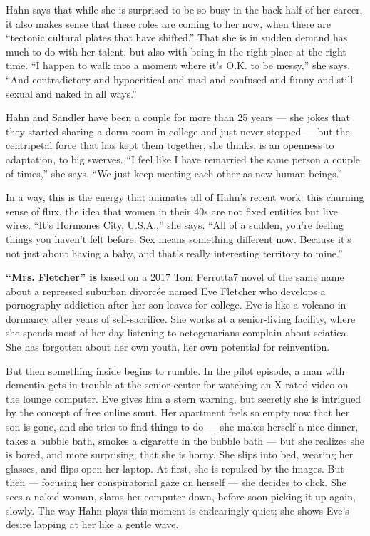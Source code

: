 Hahn says that while she is surprised to be so busy in the back half of
her career, it also makes sense that these roles are coming to her now,
when there are ``tectonic cultural plates that have shifted.'' That she
is in sudden demand has much to do with her talent, but also with being
in the right place at the right time. ``I happen to walk into a moment
where it's O.K. to be messy,'' she says. ``And contradictory and
hypocritical and mad and confused and funny and still sexual and naked
in all ways.''

Hahn and Sandler have been a couple for more than 25 years --- she jokes
that they started sharing a dorm room in college and just never stopped
--- but the centripetal force that has kept them together, she thinks,
is an openness to adaptation, to big swerves. ``I feel like I have
remarried the same person a couple of times,'' she says. ``We just keep
meeting each other as new human beings.''

In a way, this is the energy that animates all of Hahn's recent work:
this churning sense of flux, the idea that women in their 40s are not
fixed entities but live wires. ``It's Hormones City, U.S.A.,'' she says.
``All of a sudden, you're feeling things you haven't felt before. Sex
means something different now. Because it's not just about having a
baby, and that's really interesting territory to mine.''

\textbf{``Mrs. Fletcher'' is} based on a 2017
\href{http://nytimes3xbfgragh.onion\#tooltip-7}{Tom Perrotta7} novel of
the same name about a repressed suburban divorcée named Eve Fletcher who
develops a pornography addiction after her son leaves for college. Eve
is like a volcano in dormancy after years of self-sacrifice. She works
at a senior-living facility, where she spends most of her day listening
to octogenarians complain about sciatica. She has forgotten about her
own youth, her own potential for reinvention.

But then something inside begins to rumble. In the pilot episode, a man
with dementia gets in trouble at the senior center for watching an
X-rated video on the lounge computer. Eve gives him a stern warning, but
secretly she is intrigued by the concept of free online smut. Her
apartment feels so empty now that her son is gone, and she tries to find
things to do --- she makes herself a nice dinner, takes a bubble bath,
smokes a cigarette in the bubble bath --- but she realizes she is bored,
and more surprising, that she is horny. She slips into bed, wearing her
glasses, and flips open her laptop. At first, she is repulsed by the
images. But then --- focusing her conspiratorial gaze on herself --- she
decides to click. She sees a naked woman, slams her computer down,
before soon picking it up again, slowly. The way Hahn plays this moment
is endearingly quiet; she shows Eve's desire lapping at her like a
gentle wave.


